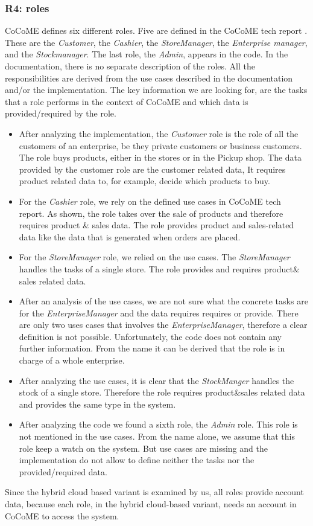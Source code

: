 \subsubsection{R4: roles}
\label{req_roles}
CoCoME defines six different roles. Five are defined in the CoCoME tech report \cite{CoCoMETechReport}. These are the \textit{Customer}, the \textit{Cashier}, the \textit{StoreManager}, the \textit{Enterprise manager}, and the \textit{Stockmanager}. The last role, the \textit{Admin},  appears in the code. In the documentation, there is no separate description of the roles. All the responsibilities are derived from the use cases described in the documentation and/or the implementation. The key information we are looking for, are the tasks that a role performs in the context of CoCoME and which data is provided/required by the role. 
\begin{itemize}
\item  After analyzing the implementation, the \textit{Customer} role is the role of all the customers of an enterprise, be they private customers or business customers. The role buys products, either in the stores or in the Pickup shop. The data provided by the customer role are the customer related data, It requires product related data to, for example, decide which products to buy.
\item For the \textit{Cashier} role, we rely on the defined use cases in CoCoME tech report. As shown, the role takes over the sale of products and therefore requires product \& sales data. The role provides product and sales-related data like the data that is generated when orders are placed.
\item For the \textit{StoreManager} role, we relied on the use cases. The \textit{StoreManager} handles the tasks of a single store. The role provides and requires product\& sales related data.
\item After an analysis of the use cases, we are not sure what the concrete tasks are for the \textit{EnterpriseManager} and the data requires requires or provide. There are only two uses cases that involves the \textit{EnterpriseManager}, therefore a clear definition is not possible. Unfortunately, the code does not contain any further information. From the name it can be derived that the role is in charge of a  whole enterprise. 
\item After analyzing the use cases, it is clear that the \textit{StockManger} handles the stock of a single store. Therefore the role requires product\&sales related data and provides the same type in the system.
\item After analyzing the code we found a sixth role, the \textit{Admin} role. This role is not mentioned in the use cases. From the name alone, we assume that this role keep a watch on the system. But use cases are missing and the implementation do not allow to define neither the tasks nor the provided/required data.
\end{itemize}
Since the hybrid cloud based variant is examined by us, all roles provide account data, because each role, in the hybrid cloud-based variant, needs an account in CoCoME to access the system. 
